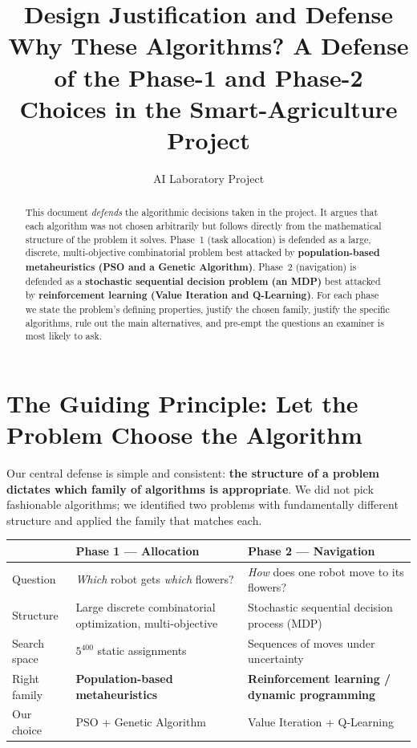 \documentclass[11pt]{article}
\title{\textbf{Design Justification and Defense}\\[4pt]
\large Why These Algorithms? A Defense of the Phase-1 and Phase-2\\
Choices in the Smart-Agriculture Project}
\author{AI Laboratory Project}
\date{}
\begin{document}
\maketitle

\begin{abstract}
\noindent
This document \emph{defends} the algorithmic decisions taken in the project. It
argues that each algorithm was not chosen arbitrarily but follows directly from
the mathematical structure of the problem it solves. Phase~1 (task allocation)
is defended as a large, discrete, multi-objective combinatorial problem best
attacked by \textbf{population-based metaheuristics (PSO and a Genetic
Algorithm)}. Phase~2
(navigation) is defended as a \textbf{stochastic sequential decision problem
(an MDP)} best attacked by \textbf{reinforcement learning (Value Iteration and
Q-Learning)}. For each phase we state the problem's defining properties, justify
the chosen family, justify the specific algorithms, rule out the main
alternatives, and pre-empt the questions an examiner is most likely to ask.
\end{abstract}

\tableofcontents

\section{The Guiding Principle: Let the Problem Choose the Algorithm}

Our central defense is simple and consistent: \textbf{the structure of a problem
dictates which family of algorithms is appropriate}. We did not pick fashionable
algorithms; we identified two problems with fundamentally different structure and
applied the family that matches each.

\begin{center}
\renewcommand{\arraystretch}{1.4}
\begin{tabular}{@{}p{2.3cm} p{5.4cm} p{5.4cm}@{}}
\toprule
& \textbf{Phase 1 --- Allocation} & \textbf{Phase 2 --- Navigation} \\
\midrule
Question & \emph{Which} robot gets \emph{which} flowers? & \emph{How} does one robot move to its flowers? \\
Structure & Large discrete combinatorial optimization, multi-objective & Stochastic sequential decision process (MDP) \\
Search space & $5^{400}$ static assignments & Sequences of moves under uncertainty \\
Right family & \textbf{Population-based metaheuristics} & \textbf{Reinforcement learning / dynamic programming} \\
Our choice & PSO + Genetic Algorithm & Value Iteration + Q-Learning \\
\bottomrule
\end{tabular}
\end{center}
\end{document}
